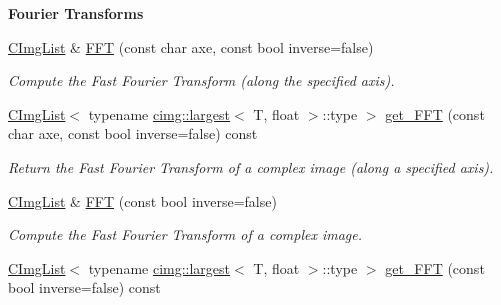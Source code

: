 \begin{Indent}{\bf Fourier Transforms}\par
{\em \label{_amgrp6a529eaa95ae0dd889ed5fa555ee0779}
 }\begin{DoxyCompactItemize}
\item 
\hypertarget{structcimg__library_1_1_c_img_list_ab8d59c92e8f81e85a36c9270921af652}{
\hyperlink{structcimg__library_1_1_c_img_list}{CImgList} \& \hyperlink{structcimg__library_1_1_c_img_list_ab8d59c92e8f81e85a36c9270921af652}{FFT} (const char axe, const bool inverse=false)}
\label{structcimg__library_1_1_c_img_list_ab8d59c92e8f81e85a36c9270921af652}

\begin{DoxyCompactList}\small\item\em Compute the Fast Fourier Transform (along the specified axis). \item\end{DoxyCompactList}\item 
\hypertarget{structcimg__library_1_1_c_img_list_a57c9f96955250fae45b78a42c088078a}{
\hyperlink{structcimg__library_1_1_c_img_list}{CImgList}$<$ typename \hyperlink{structcimg__library_1_1cimg_1_1largest}{cimg::largest}$<$ T, float $>$::type $>$ \hyperlink{structcimg__library_1_1_c_img_list_a57c9f96955250fae45b78a42c088078a}{get\_\-FFT} (const char axe, const bool inverse=false) const }
\label{structcimg__library_1_1_c_img_list_a57c9f96955250fae45b78a42c088078a}

\begin{DoxyCompactList}\small\item\em Return the Fast Fourier Transform of a complex image (along a specified axis). \item\end{DoxyCompactList}\item 
\hypertarget{structcimg__library_1_1_c_img_list_ad5c1d2707b9c37993003b0ff6a3ab752}{
\hyperlink{structcimg__library_1_1_c_img_list}{CImgList} \& \hyperlink{structcimg__library_1_1_c_img_list_ad5c1d2707b9c37993003b0ff6a3ab752}{FFT} (const bool inverse=false)}
\label{structcimg__library_1_1_c_img_list_ad5c1d2707b9c37993003b0ff6a3ab752}

\begin{DoxyCompactList}\small\item\em Compute the Fast Fourier Transform of a complex image. \item\end{DoxyCompactList}\item 
\hypertarget{structcimg__library_1_1_c_img_list_aae3a668fecaf3c0f84a87efcd7f02ffc}{
\hyperlink{structcimg__library_1_1_c_img_list}{CImgList}$<$ typename \hyperlink{structcimg__library_1_1cimg_1_1largest}{cimg::largest}$<$ T, float $>$::type $>$ \hyperlink{structcimg__library_1_1_c_img_list_aae3a668fecaf3c0f84a87efcd7f02ffc}{get\_\-FFT} (const bool inverse=false) const }
\label{structcimg__library_1_1_c_img_list_aae3a668fecaf3c0f84a87efcd7f02ffc}


\end{DoxyCompactItemize}
\end{Indent}
